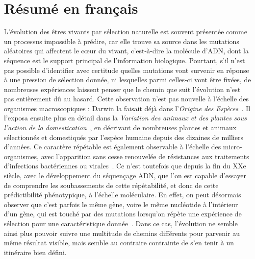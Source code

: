 
\chapter{Résumé en français}

L'évolution des êtres vivants par sélection naturelle est souvent présentée comme un processus impossible à prédire, car elle trouve sa source dans les mutations aléatoires qui affectent le cœur du vivant, c'est-à-dire la molécule d'ADN, dont la séquence est le support principal de l'information biologique.
Pourtant, s'il n'est pas possible d'identifier avec certitude quelles mutations vont survenir en réponse à une pression de sélection donnée, ni lesquelles parmi celles-ci vont être fixées, de nombreuses expériences laissent penser que le chemin que suit l'évolution n'est pas entièrement dû au hasard.
Cette observation n'est pas nouvelle à l'échelle des organismes macroscopiques : Darwin la faisait déjà dans l'\emph{Origine des Espèces}~\citep{darwin1859}.
Il l'exposa ensuite plus en détail dans la \emph{Variation des animaux et des plantes sous l'action de la domestication}~\citep{darwin1868}, en décrivant de nombreuses plantes et animaux sélectionnés et domestiqués par l'espèce humaine depuis des dizaines de milliers d'années.
Ce caractère répétable est également observable à l'échelle des micro-organismes, avec l'apparition sans cesse renouvelée de résistances aux traitements d'infections bactériennes ou virales~\citep{levy2004}.
Ce n'est toutefois que depuis la fin du XXe siècle, avec le développement du séquençage ADN, que l'on est capable d'essayer de comprendre les soubassements de cette répétabilité, et donc de cette prédictibilité phénotypique, à l'échelle moléculaire.
En effet, on peut désormais observer que c'est parfois le même gène, voire le même nucléotide à l'intérieur d'un gène, qui est touché par des mutations lorsqu'on répète une expérience de sélection pour une caractéristique donnée~\citep{wortel2021}.
Dans ce cas, l'évolution ne semble ainsi plus pouvoir suivre une multitude de chemins différents pour parvenir au même résultat visible, mais semble au contraire contrainte de s'en tenir à un itinéraire bien défini.

